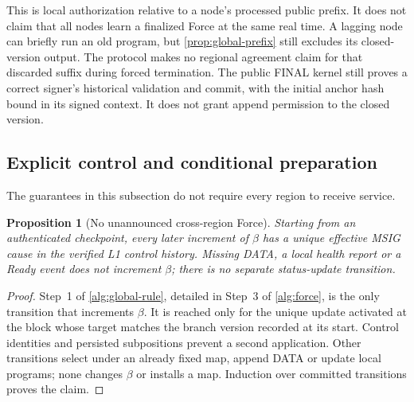 \documentclass[11pt,a4paper]{article}
\newtheorem{proposition}[proposition]{Proposition}
\newcounter{protocol}
\begin{document}
This is local authorization relative to a node's processed public
prefix. It does not claim that all nodes learn a finalized Force at the
same real time. A lagging node can briefly run an old program, but
\cref{prop:global-prefix} still excludes its closed-version output.
The protocol makes no regional agreement claim for that discarded
suffix during forced termination. The public FINAL kernel still proves
a correct signer's historical validation and commit, with the initial
anchor hash bound in its signed context. It does not grant append
permission to the closed version.
\subsection{Explicit control and conditional preparation}
\label{sec:liveness}
The guarantees in this subsection do not require every region to receive
service.

\begin{proposition}[No unannounced cross-region Force]
\label{prop:explicit-force}
Starting from an authenticated checkpoint, every later increment of
$\beta$ has a unique effective MSIG cause in the verified L1 control
history. Missing DATA, a local health report or a Ready event does not
increment $\beta$; there is no separate status-update transition.
\end{proposition}
\begin{proof}
Step~1 of \cref{alg:global-rule}, detailed in Step~3 of
\cref{alg:force}, is the only transition that increments $\beta$.
It is reached only for the unique update activated at the block
whose target matches the branch version recorded at its start. Control identities
and persisted subpositions prevent a second application. Other
transitions select under an already fixed map, append DATA or update
local programs; none changes $\beta$ or installs a map. Induction over committed
transitions proves the claim.
\end{proof}
\end{document}
